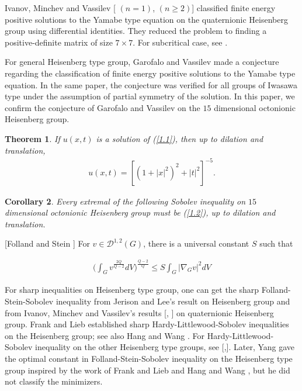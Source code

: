\documentclass[10pt,a4paper]{amsart}
\numberwithin{equation}{section}
\newtheorem{theorem}{Theorem}[section]
\newtheorem{corollary}[theorem]{Corollary}
\begin{document}
Ivanov, Minchev and Vassilev [\cite{IMV2010} $(n=1)$, \cite{IMV2023} $(n\geq 2)$] classified finite energy positive solutions to the Yamabe type equation on the quaternionic Heisenberg group  using differential identities. They reduced the problem to finding a positive-definite  matrix of size $7\times 7$. For subcritical case, see \cite{LZ}.

For general Heisenberg type group, Garofalo and Vassilev \cite{GV2001} made a conjecture regarding the classification of finite energy positive solutions to the  Yamabe type equation. In the same paper, the conjecture  was verified for all groups of Iwasawa type under the assumption of partial symmetry of the solution. In this paper, we confirm the conjecture of Garofalo and Vassilev on the $15$ dimensional octonionic Heisenberg group.



\begin{theorem}If $u(x,t)$ is a solution of (\ref{1.1}), then up to dilation and translation,     \begin{align}\label{1.2}
     u(x,t)=[(1+|x|^2)^2+|t|^2]^{-5}.
     \end{align}\end{theorem}







 \begin{corollary}
    Every  extremal of the following Sobolev inequality on $15$ dimensional octonionic Heisenberg group must be  (\ref{1.2}), up to dilation and translation. 
 \end{corollary}
 
[Folland and Stein \cite{FS1974}] For $v\in \mathscr{D}^{1,2}(G)$, there is a universal constant $S$ such that


    \begin{align}\label{1.3}
         \bigg(\int_{G}v^\frac{2Q}{Q-2}dV\bigg)^\frac{Q-2}{Q}\leq S\int_{G}|\nabla_G v|^2dV
     \end{align}


 
For sharp inequalities on Heisenberg type group, one can get the sharp Folland-Stein-Sobolev inequality from Jerison and Lee's result \cite{JL1988} on Heisenberg group and from Ivanov, Minchev and Vassilev's results [\cite{IMV2010}, \cite{IMV2023}] on quaternionic Heisenberg group. Frank and Lieb \cite{FL2012} established sharp Hardy-Littlewood-Sobolev inequalities on the Heisenberg group; see also Hang and Wang \cite{HW2022}. For Hardy-Littlewood-Sobolev inequality on the other Heisenberg type groups, see [\cite{CLZ},\cite{CLZ2}]. Later, Yang \cite{Y2024} gave the optimal constant in Folland-Stein-Sobolev inequality on the Heisenberg type group inspired by the work of Frank and Lieb \cite{FL2012} and Hang and Wang \cite{HW2022}, but he did not classify the minimizers.
\end{document}

